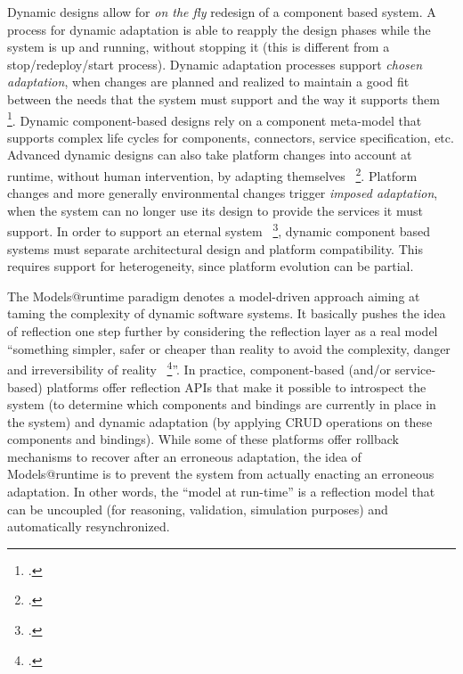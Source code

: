 Dynamic designs allow for \textit{on the fly} redesign of a component based system. 
A  process for dynamic adaptation is able to reapply the  design phases while the system is up and running, without stopping it (this is different from a stop/redeploy/start process).
Dynamic adaptation processes support \textit{chosen adaptation}, when changes are planned and realized to maintain a good fit between the needs that the system must support and the way it supports them~ \footcite{Kramer:2007kv}.
Dynamic component-based designs rely on a component meta-model that supports complex life cycles for components, connectors, service specification, etc.
Advanced dynamic designs can also take platform changes into account at runtime, without human intervention, by adapting themselves~   \footcite{Cheng:2009hh,Vromant:NPd9bKZ}.
Platform changes and more generally environmental changes trigger \textit{imposed adaptation}, when the system can no longer use its design to provide the services it must support.
In order to support an eternal system~ \footcite{Bencomo:2009tm}, dynamic component based systems must separate architectural design and platform compatibility.
This requires  support for heterogeneity, since platform evolution can be partial.

The Models@runtime paradigm denotes a model-driven approach aiming at taming the complexity of dynamic software systems. It basically pushes the idea of reflection one step further by considering the reflection layer as a real model ``something simpler, safer or cheaper than reality to avoid the complexity, danger and irreversibility of reality~ \footcite{Rothenberg89thenature}''. In practice, component-based (and/or service-based) platforms offer reflection APIs that make it possible to introspect the system (to determine which components and bindings are currently in place in the system) and dynamic adaptation (by applying CRUD operations on these components and bindings). While some of these platforms offer rollback mechanisms to recover after an erroneous adaptation, the idea of Models@runtime is to prevent the system from actually enacting an erroneous adaptation. In other words, the ``model at run-time'' is a reflection model that can be uncoupled (for reasoning, validation, simulation purposes) and automatically resynchronized.

